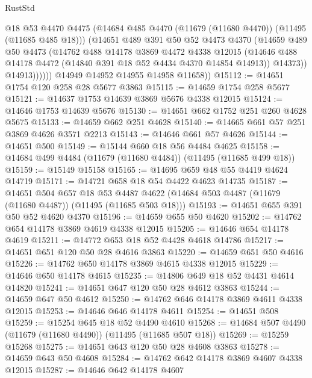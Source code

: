 \begin{lexlean}{RustStd}
\begin{coremodule}
                  @18
                  @53
                  @4470
                  @4475
                  (@14684 @485 @4470 (@11679 (@11680 @4470)) (@11495 (@11685 @485 @18)))
                  (@14651
                    @489
                    @391
                    @50
                    @52
                    @4473
                    @4370
                    (@14659
                      @489
                      @50
                      @4473
                      (@14762
                        @488
                        @14178
                        @3869
                        @4472
                        @4338
                        @12015
                        (@14646 @488 @14178 @4472 (@14840 @391 @18 @52 @4434 @4370 @14854 @14913))
                        @14373))
                    @14913))))))
        @14949
        @14952
        @14955
        @14958
        @11658))
@15112 := @14651 @1754 @120 @258 @28 @5677 @3863
@15115 := @14659 @1754 @258 @5677
@15121 := @14637 @1753 @14639 @3869 @5676 @4338 @12015
@15124 := @14646 @1753 @14639 @5676
@15130 := @14651 @662 @1752 @251 @260 @4628 @5675
@15133 := @14659 @662 @251 @4628
@15140 := @14665 @661 @57 @251 @3869 @4626 @3571 @2213
@15143 := @14646 @661 @57 @4626
@15144 := @14651 @500
@15149 := @15144 @660 @18 @56 @4484 @4625
@15158 := @14684 @499 @4484 (@11679 (@11680 @4484)) (@11495 (@11685 @499 @18))
@15159 := @15149 @15158
@15165 := @14695 @659 @48 @55 @4419 @4624 @14719
@15171 := @14721 @658 @18 @54 @4422 @4623 @14735
@15187 := @14651
    @504
    @657
    @18
    @53
    @4487
    @4622
    (@14684 @503 @4487 (@11679 (@11680 @4487)) (@11495 (@11685 @503 @18)))
@15193 := @14651 @655 @391 @50 @52 @4620 @4370
@15196 := @14659 @655 @50 @4620
@15202 := @14762 @654 @14178 @3869 @4619 @4338 @12015
@15205 := @14646 @654 @14178 @4619
@15211 := @14772 @653 @18 @52 @4428 @4618 @14786
@15217 := @14651 @651 @120 @50 @28 @4616 @3863
@15220 := @14659 @651 @50 @4616
@15226 := @14762 @650 @14178 @3869 @4615 @4338 @12015
@15229 := @14646 @650 @14178 @4615
@15235 := @14806 @649 @18 @52 @4431 @4614 @14820
@15241 := @14651 @647 @120 @50 @28 @4612 @3863
@15244 := @14659 @647 @50 @4612
@15250 := @14762 @646 @14178 @3869 @4611 @4338 @12015
@15253 := @14646 @646 @14178 @4611
@15254 := @14651 @508
@15259 := @15254 @645 @18 @52 @4490 @4610
@15268 := @14684 @507 @4490 (@11679 (@11680 @4490)) (@11495 (@11685 @507 @18))
@15269 := @15259 @15268
@15275 := @14651 @643 @120 @50 @28 @4608 @3863
@15278 := @14659 @643 @50 @4608
@15284 := @14762 @642 @14178 @3869 @4607 @4338 @12015
@15287 := @14646 @642 @14178 @4607

\end{coremodule}
\end{lexlean}
